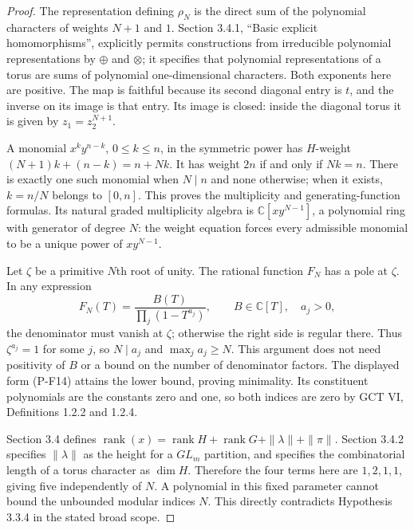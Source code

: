 \begin{proof}
The representation defining $\rho_N$ is the direct sum of the
polynomial characters of weights $N+1$ and $1$. Section 3.4.1,
``Basic explicit homomorphisms'', explicitly permits constructions
from irreducible polynomial representations by $\oplus$ and $\otimes$;
it specifies that polynomial representations of a torus are sums
of polynomial one-dimensional characters. Both exponents here are
positive. The map is faithful because its second diagonal entry is
$t$, and the inverse on its image is that entry. Its image is closed:
inside the diagonal torus it is given by $z_1=z_2^{N+1}$.

A monomial $x^k y^{n-k}$, $0\le k\le n$, in the symmetric power
has $H$-weight $(N+1)k+(n-k)=n+Nk$. It has weight $2n$ if and only
if $Nk=n$. There is exactly one such monomial when $N\mid n$ and
none otherwise; when it exists, $k=n/N$ belongs to $[0,n]$.
This proves the multiplicity and generating-function formulas.
Its natural graded multiplicity algebra is
$\mathbb C[xy^{N-1}]$, a polynomial ring with generator of degree $N$:
the weight equation forces every admissible monomial to be a unique
power of $xy^{N-1}$.

Let $\zeta$ be a primitive $N$th root of unity. The rational function
$F_N$ has a pole at $\zeta$. In any expression
\[
 F_N(T)=\frac{B(T)}{\prod_j(1-T^{a_j})},
 \qquad B\in\mathbb C[T],\quad a_j>0,
\]
the denominator must vanish at $\zeta$; otherwise the right side is
regular there. Thus $\zeta^{a_j}=1$ for some $j$, so $N\mid a_j$
and $\max_j a_j\ge N$. This argument does not need positivity of
$B$ or a bound on the number of denominator factors. The displayed
form (P-F14) attains the lower bound, proving minimality. Its
constituent polynomials are the constants zero and one, so both
indices are zero by GCT VI, Definitions 1.2.2 and 1.2.4.

Section 3.4 defines
$\operatorname{rank}(x)=\operatorname{rank}H+\operatorname{rank}G+
\|\lambda\|+\|\pi\|$.
Section 3.4.2 specifies $\|\lambda\|$ as the height for a
$GL_m$ partition, and specifies the combinatorial length of a torus
character as $\dim H$. Therefore the four terms here are
$1,2,1,1$, giving five independently of $N$. A polynomial in this
fixed parameter cannot bound the unbounded modular indices $N$.
This directly contradicts Hypothesis 3.3.4 in the stated broad scope.
\end{proof}


